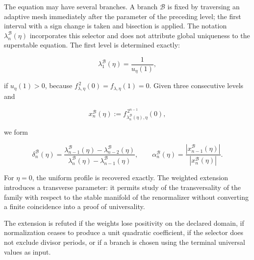 The equation may have several branches. A branch
\(\mathscr B\) is fixed by traversing an adaptive mesh immediately after the parameter of the
preceding level; the first interval with a sign change is taken
and bisection is applied. The notation
\(\lambda_n^{\mathscr B}(\eta)\) incorporates this selector and does not attribute
global uniqueness to the superstable equation. The first level is determined
exactly:

\[
 \lambda_1^{\mathscr B}(\eta)=\frac1{u_\eta(1)},
\]

if \(u_\eta(1)>0\), because
\(f_{\lambda,\eta}^{\,2}(0)=f_{\lambda,\eta}(1)=0\).
Given three consecutive levels and

\[
 x_n^{\mathscr B}(\eta)
 :=f_{\lambda_n^{\mathscr B}(\eta),\eta}^{\,2^{n-1}}(0),
\]

we form

\begin{equation}
 \delta_n^{\mathscr B}(\eta)
 =\frac{\lambda_{n-1}^{\mathscr B}(\eta)-
         \lambda_{n-2}^{\mathscr B}(\eta)}
        {\lambda_n^{\mathscr B}(\eta)-
         \lambda_{n-1}^{\mathscr B}(\eta)},
 \qquad
 \alpha_n^{\mathscr B}(\eta)
 =\frac{|x_{n-1}^{\mathscr B}(\eta)|}
        {|x_n^{\mathscr B}(\eta)|}.
 \label{mab:eq:aproximantes-ponderados-armonizados}
\end{equation}

For \(\eta=0\), the uniform profile is recovered exactly. The weighted
extension introduces a transverse parameter: it permits study of the
transversality of the family with respect to the stable manifold of the
renormalizer without converting a finite coincidence into a proof of
universality.

\begin{remark}
The extension is refuted if the weights lose positivity on the declared
domain, if normalization ceases to produce a unit quadratic
coefficient, if the selector does not exclude divisor periods, or if a branch is chosen
using the terminal universal values as input.
\end{remark}
